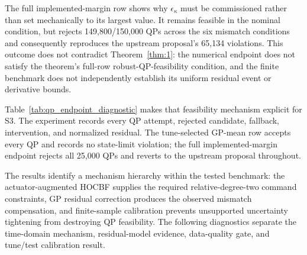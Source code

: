 The full implemented-margin row shows why $\epsilon_\kappa$ must be commissioned rather than set mechanically to its largest value. It remains feasible in the nominal condition, but rejects 149{,}800/150{,}000 QPs across the six mismatch conditions and consequently reproduces the upstream proposal's 65{,}134 violations. This outcome does not contradict Theorem~\ref{thm:1}: the numerical endpoint does not satisfy the theorem's full-row robust-QP-feasibility condition, and the finite benchmark does not independently establish its uniform residual event or derivative bounds.

Table~\ref{tab:qp_endpoint_diagnostic} makes that feasibility mechanism explicit for S3. The experiment records every QP attempt, rejected candidate, fallback, intervention, and normalized residual. The tune-selected GP-mean row accepts every QP and records no state-limit violation; the full implemented-margin endpoint rejects all 25{,}000 QPs and reverts to the upstream proposal throughout.

\begin{table}[htbp]
    \centering
    \caption{S3 solver and intervention diagnostics for the primary $\Delta g=0$ validation. Each row contains 25{,}000 controller samples. QP rejection requires non-convergence, a non-finite candidate, or normalized primal residual above $10^{-6}$; the live upstream proposal is used on a rejected cycle. NMPC uses its own horizon optimization and is therefore omitted from the projection-intervention comparison.}
    \label{tab:qp_endpoint_diagnostic}
    \small
\end{table}

The results identify a mechanism hierarchy within the tested benchmark: the actuator-augmented HOCBF supplies the required relative-degree-two command constraints, GP residual correction produces the observed mismatch compensation, and finite-sample calibration prevents unsupported uncertainty tightening from destroying QP feasibility. The following diagnostics separate the time-domain mechanism, residual-model evidence, data-quality gate, and tune/test calibration result.

